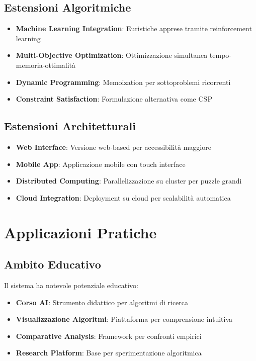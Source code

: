 \documentclass[12pt,a4paper]{report}
\theoremstyle{definition}
\begin{document}
\subsection{Estensioni Algoritmiche}

\begin{itemize}
    \item \textbf{Machine Learning Integration}: Euristiche apprese tramite reinforcement learning
    \item \textbf{Multi-Objective Optimization}: Ottimizzazione simultanea tempo-memoria-ottimalità
    \item \textbf{Dynamic Programming}: Memoization per sottoproblemi ricorrenti
    \item \textbf{Constraint Satisfaction}: Formulazione alternativa come CSP
\end{itemize}

\subsection{Estensioni Architetturali}

\begin{itemize}
    \item \textbf{Web Interface}: Versione web-based per accessibilità maggiore
    \item \textbf{Mobile App}: Applicazione mobile con touch interface
    \item \textbf{Distributed Computing}: Parallelizzazione su cluster per puzzle grandi
    \item \textbf{Cloud Integration}: Deployment su cloud per scalabilità automatica
\end{itemize}

\section{Applicazioni Pratiche}

\subsection{Ambito Educativo}

Il sistema ha notevole potenziale educativo:

\begin{itemize}
    \item \textbf{Corso AI}: Strumento didattico per algoritmi di ricerca
    \item \textbf{Visualizzazione Algoritmi}: Piattaforma per comprensione intuitiva
    \item \textbf{Comparative Analysis}: Framework per confronti empirici
    \item \textbf{Research Platform}: Base per sperimentazione algoritmica
\end{itemize}
\end{document}
